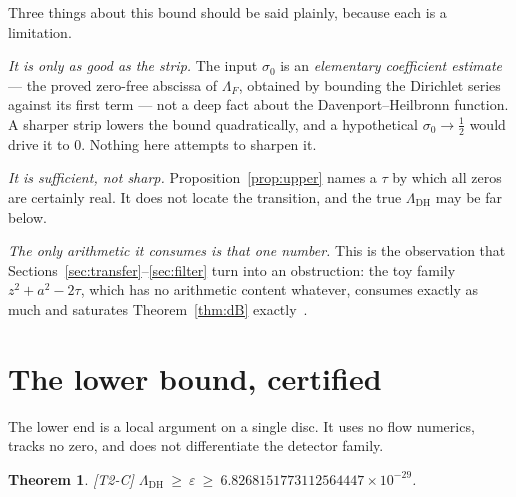 \documentclass[11pt,a4paper]{article}
\newtheorem{theorem}{Theorem}
\theoremstyle{remark}
\newcommand{\tier}[1]{{\small\textsf{[#1]}}}
\newcommand{\LamDH}{\Lambda_{\mathrm{DH}}}
\begin{document}
Three things about this bound should be said plainly, because each is a limitation.

\emph{It is only as good as the strip.} The input $\sigma_0$ is an \emph{elementary
coefficient estimate} --- the proved zero-free abscissa of $\Lambda_F$, obtained by bounding
the Dirichlet series against its first term --- not a deep fact about the
Davenport--Heilbronn function. A sharper strip lowers the bound quadratically, and a
hypothetical $\sigma_0\to\tfrac12$ would drive it to $0$. Nothing here attempts to sharpen it.

\emph{It is sufficient, not sharp.} Proposition~\ref{prop:upper} names a $\tau$ by which all
zeros are certainly real. It does not locate the transition, and the true $\LamDH$ may be far
below.

\emph{The only arithmetic it consumes is that one number.} This is the observation that
Sections~\ref{sec:transfer}--\ref{sec:filter} turn into an obstruction: the toy family
$z^2+a^2-2\tau$, which has no arithmetic content whatever, consumes exactly as much and
saturates Theorem~\ref{thm:dB} exactly~\cite[\S5]{audit}.

\section{The lower bound, certified}\label{sec:lower}

The lower end is a local argument on a single disc. It uses no flow numerics, tracks no
zero, and does not differentiate the detector family.

\begin{theorem}\label{thm:lower}
\tier{T2-C} $\LamDH\ \ge\ \varepsilon\ \ge\ 6.8268151773112564447\times10^{-29}$.
\end{theorem}
\end{document}
